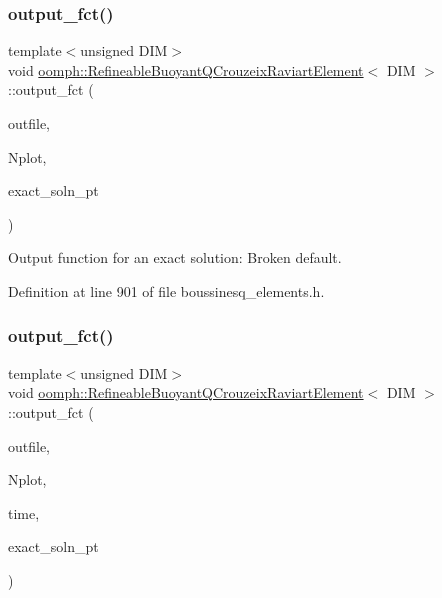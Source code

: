 \subsubsection{\texorpdfstring{output\+\_\+fct()}{output\_fct()}\hspace{0.1cm}{\footnotesize\ttfamily [1/2]}}
{\footnotesize\ttfamily template$<$unsigned D\+IM$>$ \\
void \hyperlink{classoomph_1_1RefineableBuoyantQCrouzeixRaviartElement}{oomph\+::\+Refineable\+Buoyant\+Q\+Crouzeix\+Raviart\+Element}$<$ D\+IM $>$\+::output\+\_\+fct (\begin{DoxyParamCaption}\item[{std\+::ostream \&}]{outfile,  }\item[{const unsigned \&}]{Nplot,  }\item[{Finite\+Element\+::\+Steady\+Exact\+Solution\+Fct\+Pt}]{exact\+\_\+soln\+\_\+pt }\end{DoxyParamCaption})\hspace{0.3cm}{\ttfamily [inline]}}



Output function for an exact solution\+: Broken default. 



Definition at line 901 of file boussinesq\+\_\+elements.\+h.

\mbox{\label{classoomph_1_1RefineableBuoyantQCrouzeixRaviartElement_aa1eaab23a14039a18701b5666629b5bc}} 
\subsubsection{\texorpdfstring{output\+\_\+fct()}{output\_fct()}\hspace{0.1cm}{\footnotesize\ttfamily [2/2]}}
{\footnotesize\ttfamily template$<$unsigned D\+IM$>$ \\
void \hyperlink{classoomph_1_1RefineableBuoyantQCrouzeixRaviartElement}{oomph\+::\+Refineable\+Buoyant\+Q\+Crouzeix\+Raviart\+Element}$<$ D\+IM $>$\+::output\+\_\+fct (\begin{DoxyParamCaption}\item[{std\+::ostream \&}]{outfile,  }\item[{const unsigned \&}]{Nplot,  }\item[{const double \&}]{time,  }\item[{Finite\+Element\+::\+Unsteady\+Exact\+Solution\+Fct\+Pt}]{exact\+\_\+soln\+\_\+pt }\end{DoxyParamCaption})\hspace{0.3cm}{\ttfamily [inline]}}



